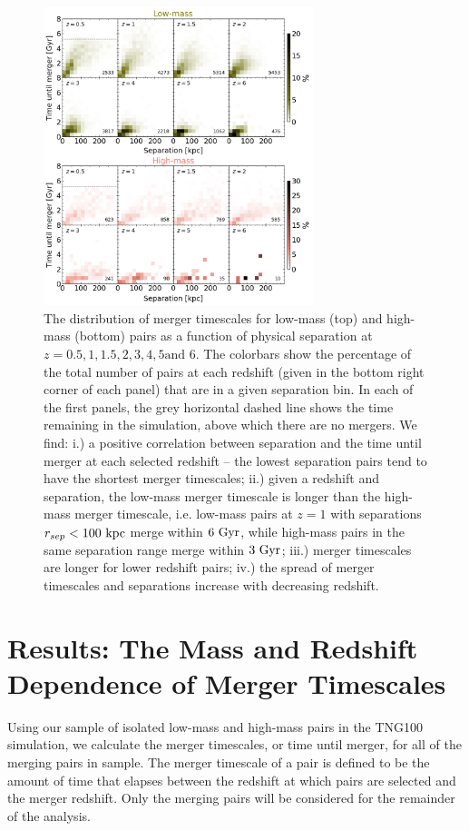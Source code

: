 \documentclass[twocolumn,linenumbers]{aastex631}
\begin{document}
\begin{figure}[htb!]
    \begin{center}
    \includegraphics[width=0.7\textwidth]{plots/bet-on-it/8_2Dhist.png}
    \caption{The distribution of merger timescales for low-mass (top) and high-mass (bottom) pairs as a function of physical separation at $z=0.5,1,1.5,2,3,4,5\mbox{and }6$. 
    The colorbars show the percentage of the total number of pairs at each redshift (given in the bottom right corner of each panel) that are in a given separation bin.
    In each of the first panels, the grey horizontal dashed line shows the time remaining in the simulation, above which there are no mergers. 
    We find:
    i.) a positive correlation between separation and the time until merger at each selected redshift -- the lowest separation pairs tend to have the shortest merger timescales; 
    ii.) given a redshift and separation, the low-mass merger timescale is longer than the high-mass merger timescale, i.e. low-mass pairs at $z=1$ with separations $r_{sep}<100\,\mathrm{\,kpc}$ merge within $6\, \mathrm{\,Gyr}$, while high-mass pairs in the same separation range merge within $3\, \mathrm{\,Gyr}$; 
    iii.) merger timescales are longer for lower redshift pairs; 
    iv.) the spread of merger timescales and separations increase with decreasing redshift. }
    \label{fig:2dhist}
    \end{center}
\end{figure}

\section{Results: The Mass and Redshift Dependence of Merger Timescales}\label{sec:results}
    Using our sample of isolated low-mass and high-mass pairs in the TNG100 simulation, we calculate the merger timescales, or time until merger, for all of the merging pairs in sample. 
    The merger timescale of a pair is defined to be the amount of time that elapses between the redshift at which pairs are selected and the merger redshift.
    Only the merging pairs will be considered for the remainder of the analysis. 
    
\end{document}
